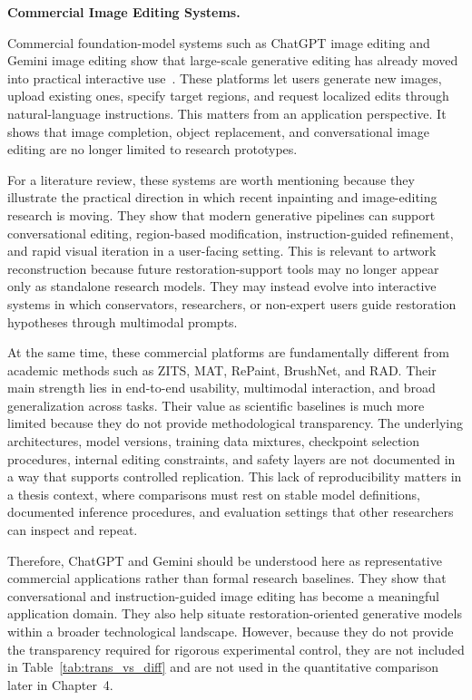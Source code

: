 \documentclass[12pt, twoside]{report}
\begin{document}
\medskip
\noindent\textbf{Commercial Image Editing Systems.}

Commercial foundation-model systems such as ChatGPT image editing and Gemini image editing show that large-scale generative editing has already moved into practical interactive use~\cite{openai_chatgpt_images,openai_chatgpt_editing,google_gemini_images,google_gemini_editing}. These platforms let users generate new images, upload existing ones, specify target regions, and request localized edits through natural-language instructions. This matters from an application perspective. It shows that image completion, object replacement, and conversational image editing are no longer limited to research prototypes.

For a literature review, these systems are worth mentioning because they illustrate the practical direction in which recent inpainting and image-editing research is moving. They show that modern generative pipelines can support conversational editing, region-based modification, instruction-guided refinement, and rapid visual iteration in a user-facing setting. This is relevant to artwork reconstruction because future restoration-support tools may no longer appear only as standalone research models. They may instead evolve into interactive systems in which conservators, researchers, or non-expert users guide restoration hypotheses through multimodal prompts.

At the same time, these commercial platforms are fundamentally different from academic methods such as ZITS, MAT, RePaint, BrushNet, and RAD. Their main strength lies in end-to-end usability, multimodal interaction, and broad generalization across tasks. Their value as scientific baselines is much more limited because they do not provide methodological transparency. The underlying architectures, model versions, training data mixtures, checkpoint selection procedures, internal editing constraints, and safety layers are not documented in a way that supports controlled replication. This lack of reproducibility matters in a thesis context, where comparisons must rest on stable model definitions, documented inference procedures, and evaluation settings that other researchers can inspect and repeat.

Therefore, ChatGPT and Gemini should be understood here as representative commercial applications rather than formal research baselines. They show that conversational and instruction-guided image editing has become a meaningful application domain. They also help situate restoration-oriented generative models within a broader technological landscape. However, because they do not provide the transparency required for rigorous experimental control, they are not included in Table~\ref{tab:trans_vs_diff} and are not used in the quantitative comparison later in Chapter~4.
\end{document}
